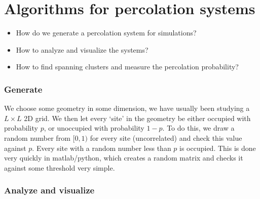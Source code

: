 \documentclass[a4paper, 11pt, notitlepage, english]{article}
\begin{document}


\section{Algorithms for percolation systems}
\begin{itemize}
\item How do we generate a percolation system for simulations? 
\item How to analyze and visualize the systems?
\item How to find spanning clusters and measure the percolation probability?
\end{itemize}

\subsubsection*{Generate}

We choose some geometry in some dimension, we have usually been studying a $L\times L$ 2D grid. We then let every `site' in the geometry be either occupied with probability $p$, or unoccupied with probability $1-p$. To do this, we draw a random number from $[0, 1)$ for every site (uncorrelated) and check this value against $p$. Every site with a random number less than $p$ is occupied. This is done very quickly in matlab/python, which creates a random matrix and checks it against some threshold very simple. 

\subsubsection*{Analyze and visualize}
\end{document}
